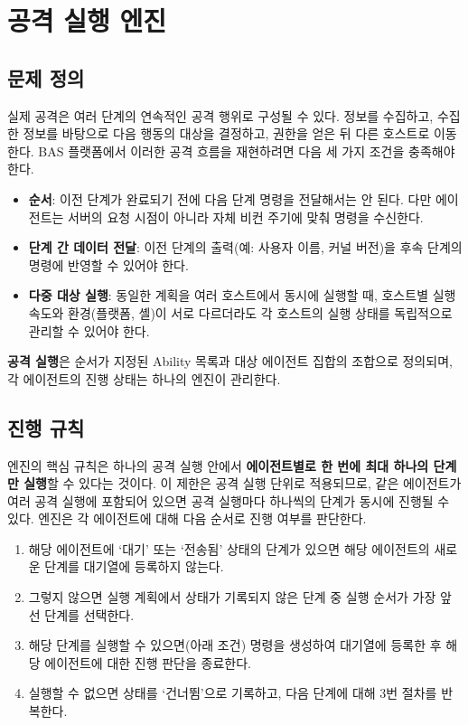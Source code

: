 \clearpage

\section{공격 실행 엔진}\label{sec:operations}

\subsection{문제 정의}\label{subsec:op-problem}

실제 공격은 여러 단계의 연속적인 공격 행위로 구성될 수 있다.
정보를 수집하고, 수집한 정보를 바탕으로 다음 행동의 대상을 결정하고, 권한을 얻은 뒤 다른 호스트로 이동한다.
BAS 플랫폼에서 이러한 공격 흐름을 재현하려면 다음 세 가지 조건을 충족해야 한다.

\begin{itemize}
    \item \textbf{순서}: 이전 단계가 완료되기 전에 다음 단계 명령을 전달해서는 안 된다. 다만 에이전트는 서버의 요청 시점이 아니라 자체 비컨 주기에 맞춰 명령을 수신한다.
    \item \textbf{단계 간 데이터 전달}: 이전 단계의 출력(예: 사용자 이름, 커널 버전)을 후속 단계의 명령에 반영할 수 있어야 한다.
    \item \textbf{다중 대상 실행}: 동일한 계획을 여러 호스트에서 동시에 실행할 때, 호스트별 실행 속도와 환경(플랫폼, 셸)이 서로 다르더라도 각 호스트의 실행 상태를 독립적으로 관리할 수 있어야 한다.
\end{itemize}

\textbf{공격 실행}은 순서가 지정된 Ability 목록과 대상 에이전트 집합의 조합으로 정의되며, 각 에이전트의 진행 상태는 하나의 엔진이 관리한다.

\subsection{진행 규칙}\label{subsec:op-rules}

엔진의 핵심 규칙은 하나의 공격 실행 안에서 \textbf{에이전트별로 한 번에 최대 하나의 단계만 실행}할 수 있다는 것이다.
이 제한은 공격 실행 단위로 적용되므로, 같은 에이전트가 여러 공격 실행에 포함되어 있으면 공격 실행마다 하나씩의 단계가 동시에 진행될 수 있다.
엔진은 각 에이전트에 대해 다음 순서로 진행 여부를 판단한다.

\begin{enumerate}
    \item 해당 에이전트에 `대기' 또는 `전송됨' 상태의 단계가 있으면 해당 에이전트의 새로운 단계를 대기열에 등록하지 않는다.
    \item 그렇지 않으면 실행 계획에서 상태가 기록되지 않은 단계 중 실행 순서가 가장 앞선 단계를 선택한다.
    \item 해당 단계를 실행할 수 있으면(아래 조건) 명령을 생성하여 대기열에 등록한 후 해당 에이전트에 대한 진행 판단을 종료한다.
    \item 실행할 수 없으면 상태를 `건너뜀'으로 기록하고, 다음 단계에 대해 3번 절차를 반복한다.
\end{enumerate}

